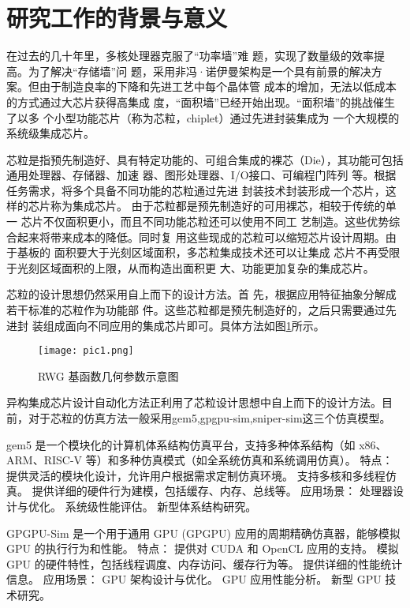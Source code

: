 \documentclass[bachelor]{thesis-uestc}
\begin{document}
\section{研究工作的背景与意义}

在过去的几十年里，多核处理器克服了“功率墙”难
题，实现了数量级的效率提高。为了解决“存储墙”问
题，采用非冯·诺伊曼架构是一个具有前景的解决方
案。但由于制造良率的下降和先进工艺中每个晶体管
成本的增加，无法以低成本的方式通过大芯片获得高集成
度，“面积墙”已经开始出现。“面积墙”的挑战催生了以多
个小型功能芯片（称为芯粒，chiplet）通过先进封装集成为
一个大规模的系统级集成芯片。

芯粒是指预先制造好、具有特定功能的、可组合集成的裸芯（Die），其功能可包括通用处理器、存储器、加速
器、图形处理器、I/O接口、可编程门阵列
等。根据任务需求，将多个具备不同功能的芯粒通过先进
封装技术封装形成一个芯片，这样的芯片称为集成芯片。
由于芯粒都是预先制造好的可用裸芯，相较于传统的单一
芯片不仅面积更小，而且不同功能芯粒还可以使用不同工
艺制造。这些优势综合起来将带来成本的降低。同时复
用这些现成的芯粒可以缩短芯片设计周期。由于基板的
面积要大于光刻区域面积，多芯粒集成技术还可以让集成
芯片不再受限于光刻区域面积的上限，从而构造出面积更
大、功能更加复杂的集成芯片。

芯粒的设计思想仍然采用自上而下的设计方法。首
先，根据应用特征抽象分解成若干标准的芯粒作为功能部
件。这些芯粒都是预先制造好的，之后只需要通过先进封
装组成面向不同应用的集成芯片即可。具体方法如图\ref{pic1}所示。
    \begin{figure}[h]
    \texttt{[image: pic1.png]}
    \caption{RWG 基函数几何参数示意图}
    \label{pic1}
    \end{figure}

异构集成芯片设计自动化方法正利用了芯粒设计思想中自上而下的设计方法。目前，对于芯粒的仿真方法一般采用gem5,gpgpu-sim,sniper-sim这三个仿真模型。

gem5 是一个模块化的计算机体系结构仿真平台，支持多种体系结构（如 x86、ARM、RISC-V 等）和多种仿真模式（如全系统仿真和系统调用仿真）。
特点：
提供灵活的模块化设计，允许用户根据需求定制仿真环境。
支持多核和多线程仿真。
提供详细的硬件行为建模，包括缓存、内存、总线等。
应用场景：
处理器设计与优化。
系统级性能评估。
新型体系结构研究。

GPGPU-Sim 是一个用于通用 GPU (GPGPU) 应用的周期精确仿真器，能够模拟 GPU 的执行行为和性能。
特点：
提供对 CUDA 和 OpenCL 应用的支持。
模拟 GPU 的硬件特性，包括线程调度、内存访问、缓存行为等。
提供详细的性能统计信息。
应用场景：
GPU 架构设计与优化。
GPU 应用性能分析。
新型 GPU 技术研究。
\end{document}
